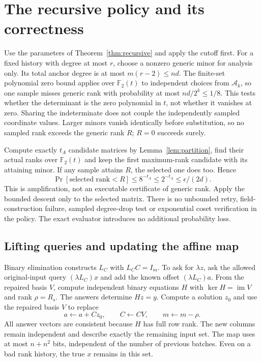 \documentclass[11pt]{article}
\theoremstyle{remark}\newtheorem{remark}[theorem]{Remark}
\newcommand{\F}{\mathbb F}
\begin{document}
\section{The recursive policy and its correctness}\label{sec:recursion}
Use the parameters of Theorem~\ref{thm:recursive} and apply the cutoff first. For a fixed history with degree at most $r$, choose a nonzero generic minor for analysis only. Its total anchor degree is at most $m(r-2)\le nd$. The finite-set polynomial zero bound applies over $\F_2(t)$ to independent choices from $\mathcal A_k$, so one sample misses generic rank with probability at most $nd/2^k\le1/8$. This tests whether the determinant is the zero polynomial in $t$, not whether it vanishes at zero. Sharing the indeterminate does not couple the independently sampled coordinate values. Larger minors vanish identically before substitution, so no sampled rank exceeds the generic rank $R$; $R=0$ succeeds surely.

Compute exactly $t_A$ candidate matrices by Lemma~\ref{lem:partition}, find their actual ranks over $\F_2(t)$ and keep the first maximum-rank candidate with its attaining minor. If any sample attains $R$, the selected one does too. Hence
\begin{equation}\label{eq:stagefailure}
 \Pr[\text{selected rank}<R]\le8^{-t_A}\le2^{-t_A}\le\epsilon/(2d).
\end{equation}
This is amplification, not an executable certificate of generic rank. Apply the bounded descent only to the selected matrix. There is no unbounded retry, field-construction failure, sampled degree-drop test or exponential coset verification in the policy. The exact evaluator introduces no additional probability loss.

\subsection{Lifting queries and updating the affine map}
Binary elimination constructs $L_C$ with $L_CC=I_m$. To ask for $\lambda z$, ask the allowed original-input query $(\lambda L_C)x$ and add the known offset $(\lambda L_C)a$. From the repaired basis $V$, compute independent binary equations $H$ with $\ker H=\operatorname{im}V$ and rank $\rho=R_s$. The answers determine $Hz=y$. Compute a solution $z_0$ and use the repaired basis $V$ to replace
\begin{equation}\label{eq:affineupdate}
 a\leftarrow a+Cz_0,\qquad C\leftarrow CV,\qquad m\leftarrow m-\rho.
\end{equation}
All answer vectors are consistent because $H$ has full row rank. The new columns remain independent and describe exactly the remaining input set. The map uses at most $n+n^2$ bits, independent of the number of previous batches. Even on a bad rank history, the true $x$ remains in this set.
\end{document}
